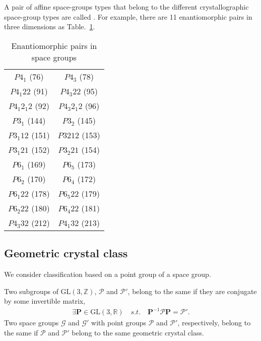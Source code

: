 A pair of affine space-groups types that belong to the different crystallographic space-group types are called .
For example, there are 11 enantiomorphic pairs in three dimensions as Table.~\ref{table:enantiomorphic-pairs-3d}.

\begin{table}[htb]
  \centering
  \caption{Enantiomorphic pairs in space groups}
  \label{table:enantiomorphic-pairs-3d}
  \begin{tabular}[h]{cc}
    $P 4_{1}$ (76)         & $P 4_{3}$ (78) \\
    $P 4_{1} 2 2$ (91)     & $P 4_{3} 2 2$ (95) \\
    $P 4_{1} 2_{1} 2$ (92) & $P 4_{3} 2_{1} 2$ (96) \\
    $P 3_{1}$ (144)        & $P 3_{2}$ (145) \\
    $P 3_{1} 1 2$ (151)    & $P 3{2} 1 2$ (153) \\
    $P 3_{1} 2 1$ (152)    & $P 3_{2} 2 1$ (154) \\
    $P 6_{1}$ (169)        & $P 6_{5}$ (173) \\
    $P 6_{2}$ (170)        & $P 6_{4}$ (172) \\
    $P 6_{1} 2 2$ (178)    & $P 6_{5} 2 2$ (179) \\
    $P 6_{2} 2 2$ (180)    & $P 6_{4} 2 2$ (181) \\
    $P 4_{3} 3 2$ (212)    & $P 4_{1} 3 2$ (213)
  \end{tabular}
\end{table}

\subsection{\label{sec:geometric-class}Geometric crystal class}

We consider classification based on a point group of a space group.

\begin{screen}
  \begin{defn}
    Two subgroups of $\mathrm{GL}(3, \mathbb{Z})$, $\mathcal{P}$ and $\mathcal{P}'$, belong to the same  if they are conjugate by some invertible matrix,
    \begin{align}
      \exists \bm{P} \in \mathrm{GL}(3, \mathbb{R}) \quad s.t. \quad \bm{P}^{-1} \mathcal{P} \bm{P} = \mathcal{P}'.
    \end{align}
    Two space groups $\mathcal{G}$ and $\mathcal{G}'$ with point groups $\mathcal{P}$ and $\mathcal{P}'$, respectively, belong to the same  if $\mathcal{P}$ and $\mathcal{P}'$ belong to the same geometric crystal class.
  \end{defn}
\end{screen}

